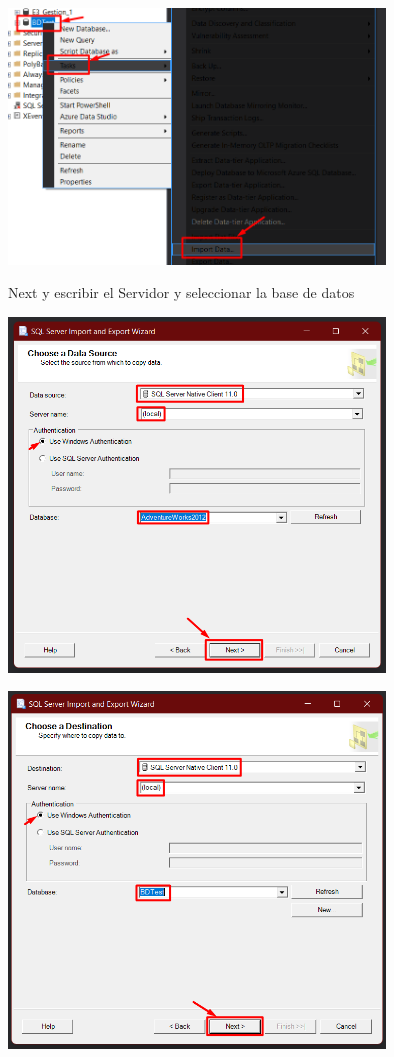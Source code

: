 \documentclass[12pt,letterpaper]{article}
\begin{document}
\begin{center}
    \includegraphics[width=10cm]{./img/img1.png}
\end{center}

Next y escribir el Servidor y seleccionar la base de datos

\begin{center}
    \includegraphics[width=10cm]{./img/img2.png}
\end{center}

\begin{center}
    \includegraphics[width=10cm]{./img/img3.png}
\end{center}
\end{document}
